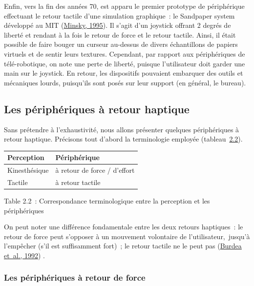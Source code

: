 \documentclass[
]{book}
\begin{document}
Enfin, vers la fin des années 70, est apparu le premier prototype de
périphérique effectuant le retour tactile d'une simulation graphique~: le
Sandpaper system développé au MIT (\protect\hyperlink{ref-minsky1995computational}{Minsky, 1995}). Il s'agit d'un
joystick offrant 2 degrés de liberté et rendant à
la fois le retour de force et le retour tactile. Ainsi, il était possible de
faire bouger un curseur au-dessus de divers échantillons de papiers virtuels
et de sentir leurs textures. Cependant, par rapport aux périphériques de
télé-robotique, on note une perte de liberté, puisque l'utilisateur doit
garder une main sur le joystick. En retour, les dispositifs pouvaient
embarquer des outils et mécaniques lourds, puisqu'ils sont posés sur leur
support (en général, le bureau).

\hypertarget{les-puxe9riphuxe9riques-uxe0-retour-haptique}{%
\subsection{Les périphériques à retour haptique}\label{les-puxe9riphuxe9riques-uxe0-retour-haptique}}

Sans prétendre à l'exhaustivité, nous allons présenter quelques
périphériques à retour haptique. Précisons tout d'abord la terminologie
employée (tableau~\protect\hyperlink{cap:Correspondance-terminologique-entre}{2.2}).

\begin{longtable}[]{@{}ll@{}}
\toprule()
Perception & Périphérique \\
\midrule()
\endhead
Kinesthésique & à retour de force / d'effort \\
Tactile & à retour tactile \\
\bottomrule()
\end{longtable}

Table 2.2~: Correspondance
terminologique entre la perception et les périphériques

On peut noter une différence fondamentale entre les deux retours
haptiques~: le retour de force peut s'opposer à un mouvement volontaire de
l'utilisateur,~jusqu'à l'empêcher (s'il est suffisamment fort)~; le
retour tactile ne le peut pas (\href{047-bibliographie.html\#Burdea1992}{Burdea
et~al., 1992}) .

\hypertarget{les-puxe9riphuxe9riques-uxe0-retour-de-force}{%
\subsubsection{Les périphériques à retour de force}\label{les-puxe9riphuxe9riques-uxe0-retour-de-force}}
\end{document}
